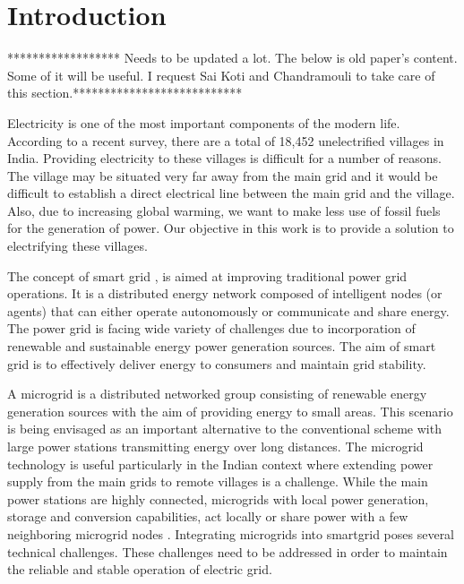 \documentclass[conference]{IEEEtran}
\begin{document}




%
\IEEEpeerreviewmaketitle



\section{Introduction}


****************** Needs to be updated a lot. The below is old paper's content. Some of it will be useful. I request Sai Koti and Chandramouli to take care of this section.***************************

Electricity is one of the most important components of the modern life. According to a recent survey, there are a total of 18,452 unelectrified villages in India. Providing electricity to these villages is difficult for a number of reasons. The village may be situated very far away from the main grid and it would be difficult to establish a direct electrical line between the main grid and the village. Also, due to increasing global warming, we want to make less use of fossil fuels for the generation of power. Our objective in this work is to provide a solution to electrifying these villages.

The concept of smart grid \cite{weiss1999multiagent}, is aimed at improving traditional power grid operations.  It is a distributed energy network composed of intelligent nodes (or agents) that can either operate autonomously or communicate and share energy. The  power grid is facing wide variety of challenges due to incorporation of renewable and sustainable energy power generation sources. The aim of smart grid is to effectively deliver energy to consumers and maintain grid stability.

A microgrid is a distributed networked group consisting of renewable energy generation sources with the aim of providing energy to small areas. This scenario is being envisaged as an important alternative to the conventional scheme with large power stations transmitting energy over long distances. The microgrid technology is useful particularly in the Indian context where extending power supply from the main grids to remote villages is a challenge. While the main power stations are highly connected, microgrids with local power generation, storage and conversion capabilities, act locally or share power with a few neighboring microgrid nodes \cite{farhangi2010path}.
Integrating microgrids into smartgrid poses several technical challenges. These challenges need to be addressed in order to maintain the reliable and stable operation of electric grid.
\end{document}
